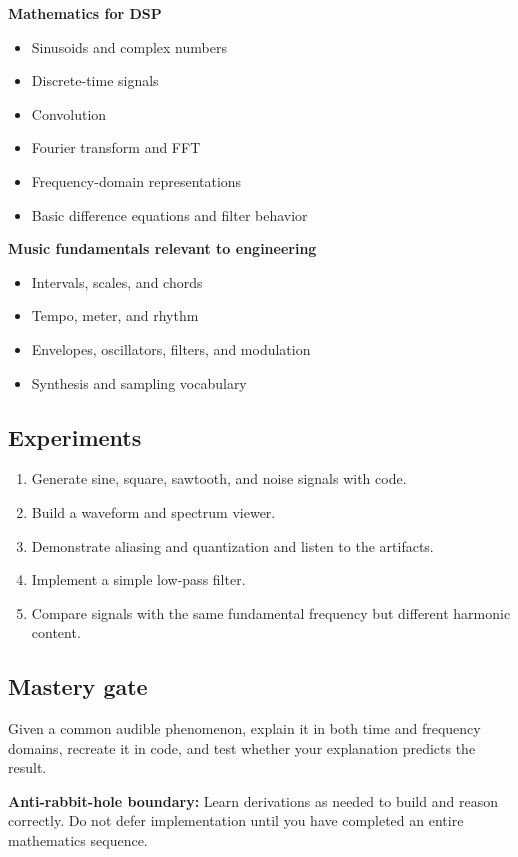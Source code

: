 \documentclass[11pt,letterpaper]{article}
\begin{document}
\textbf{Mathematics for DSP}

\begin{itemize}
\item Sinusoids and complex numbers
\item Discrete-time signals
\item Convolution
\item Fourier transform and FFT
\item Frequency-domain representations
\item Basic difference equations and filter behavior
\end{itemize}

\textbf{Music fundamentals relevant to engineering}

\begin{itemize}
\item Intervals, scales, and chords
\item Tempo, meter, and rhythm
\item Envelopes, oscillators, filters, and modulation
\item Synthesis and sampling vocabulary
\end{itemize}

\subsection*{Experiments}\label{experiments}

\begin{enumerate}
\item Generate sine, square, sawtooth, and noise signals with code.
\item Build a waveform and spectrum viewer.
\item Demonstrate aliasing and quantization and listen to the artifacts.
\item Implement a simple low-pass filter.
\item Compare signals with the same fundamental frequency but different harmonic content.
\end{enumerate}

\subsection*{Mastery gate}\label{mastery-gate-1}

Given a common audible phenomenon, explain it in both time and frequency domains, recreate it in code, and test whether your explanation predicts the result.

\textbf{Anti-rabbit-hole boundary:} Learn derivations as needed to build and reason correctly. Do not defer implementation until you have completed an entire mathematics sequence.
\end{document}
